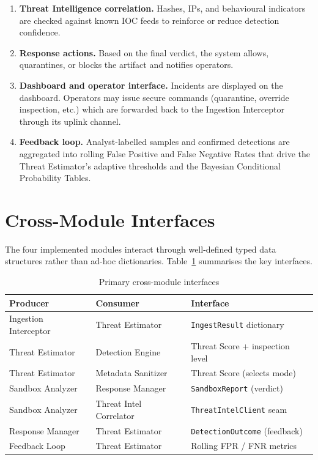 \documentclass[12pt, a4paper]{report}
\begin{document}
\begin{enumerate}
    \item \textbf{Threat Intelligence correlation.} Hashes, IPs, and
          behavioural indicators are checked against known IOC feeds to
          reinforce or reduce detection confidence.

    \item \textbf{Response actions.} Based on the final verdict, the
          system allows, quarantines, or blocks the artifact and notifies
          operators.

    \item \textbf{Dashboard and operator interface.} Incidents are
          displayed on the dashboard. Operators may issue secure commands
          (quarantine, override inspection, etc.) which are forwarded back
          to the Ingestion Interceptor through its uplink channel.

    \item \textbf{Feedback loop.} Analyst-labelled samples and confirmed
          detections are aggregated into rolling False Positive and False
          Negative Rates that drive the Threat Estimator's adaptive
          thresholds and the Bayesian Conditional Probability Tables.
\end{enumerate}

\section{Cross-Module Interfaces}

The four implemented modules interact through well-defined typed data
structures rather than ad-hoc dictionaries. Table~\ref{tab:interfaces}
summarises the key interfaces.

\begin{table}[H]
\centering
\caption{Primary cross-module interfaces}
\label{tab:interfaces}
\begin{tabular}{|l|l|l|}
\hline
\textbf{Producer} & \textbf{Consumer} & \textbf{Interface} \\
\hline
Ingestion Interceptor & Threat Estimator & \texttt{IngestResult} dictionary \\
\hline
Threat Estimator & Detection Engine & Threat Score + inspection level \\
\hline
Threat Estimator & Metadata Sanitizer & Threat Score (selects mode) \\
\hline
Sandbox Analyzer & Response Manager & \texttt{SandboxReport} (verdict) \\
\hline
Sandbox Analyzer & Threat Intel Correlator & \texttt{ThreatIntelClient} seam \\
\hline
Response Manager & Threat Estimator & \texttt{DetectionOutcome} (feedback) \\
\hline
Feedback Loop & Threat Estimator & Rolling FPR / FNR metrics \\
\hline
\end{tabular}
\end{table}
\end{document}
